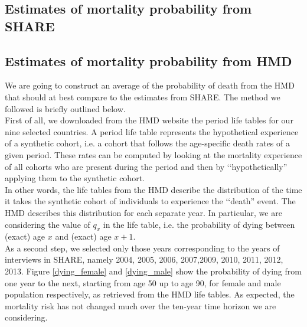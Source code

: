 \subsection{Estimates of mortality probability from SHARE}




\subsection{Estimates of mortality probability from HMD}

We are going to construct an average of the probability of death from the HMD that should at best compare to the estimates from SHARE. The method we followed is briefly outlined below.\\

First of all, we downloaded from the HMD website the period life tables for our nine selected countries. A period life table represents the hypothetical experience of a synthetic cohort, i.e. a cohort that follows the age-specific death rates of a given period. These rates can be computed by looking at the mortality experience of all cohorts who are present during the period and then by \lq\lq hypothetically'' applying them to the synthetic cohort.\\
In other words, the life tables from the HMD describe the distribution of the time it takes the synthetic cohort of individuals to experience the \lq\lq death'' event. The HMD describes this distribution for each separate year. In particular, we are considering the value of
$q_x$ in the life table, i.e. the probability of dying between (exact) age $x$ and (exact) age $x+1$. \\

As a second step, we selected only those years corresponding to the years of interviews in SHARE, namely 2004, 2005,  2006, 2007,2009, 2010, 2011, 2012, 2013. Figure \ref{dying_female} and \ref{dying_male} show the probability of dying from one year to the next, starting from age 50 up to age 90, for female and male population respectively, as retrieved from the HMD life tables. As expected, the mortality risk has not changed much over the ten-year time horizon we are considering.


